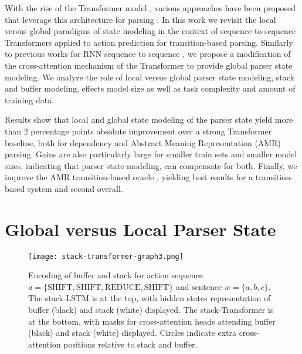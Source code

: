 \documentclass[11pt,a4paper]{article}
\begin{document}
With the rise of the Transformer model \cite{vaswani2017attention}, various approaches have been proposed that leverage this architecture for parsing \cite{kondratyuk201975,kulmizev2019deep,mrini2019rethinking,ahmad-etal-2019-difficulties,cai2020amr}. In this work we revisit the local versus global paradigms of state modeling in the context of sequence-to-sequence Transformers applied to action prediction for transition-based parsing. Similarly to previous works for RNN sequence to sequence \cite{liu-zhang-2017-encoder,zhang-etal-2017-stack}, we propose a modification of the cross-attention mechanism of the Transformer to provide global parser state modeling. We analyze the role of local versus global parser state modeling, stack and buffer modeling, effects model size as well as task complexity and amount of training data.

Results show that local and global state modeling of the parser state yield more than $2$ percentage points absolute improvement over a strong Transformer baseline, both for dependency and Abstract Meaning Representation (AMR) parsing. Gains are also particularly large for smaller train sets and smaller model sizes, indicating that parser state modeling, can compensate for both. Finally, we improve the AMR transition-based oracle \cite{ballesteros2017amr}, yielding best results for a transition-based system and second overall.

\section{Global versus Local Parser State}
\label{section:state}
\begin{figure*}
\centering
  \texttt{[image: stack-transformer-graph3.png]}
  \caption{Encoding of buffer and stack for action sequence $a = \{\mbox{SHIFT}, \mbox{SHIFT}, \mbox{REDUCE}, \mbox{SHIFT}\}$ and sentence $w = \{a, b, c\}$. The stack-LSTM is at the top, with hidden states representation of buffer (black) and stack (white) displayed. The stack-Transformer is at the bottom, with masks for cross-attention heads attending buffer (black) and stack (white) displayed. Circles indicate extra cross-attention positions relative to stack and buffer.}
  \label{fig:stack-encodings}
\end{figure*}
\end{document}
